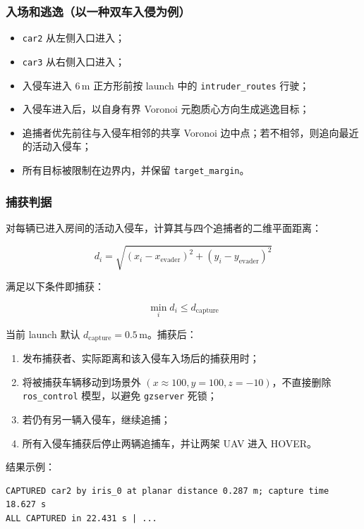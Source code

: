 \subsubsection{入场和逃逸（以一种双车入侵为例）}
\begin{itemize}
\item \texttt{car2} 从左侧入口进入；
\item \texttt{car3} 从右侧入口进入；
\item 入侵车进入 $6\,\mathrm{m}$ 正方形前按 launch 中的 \texttt{intruder\_routes} 行驶；
\item 入侵车进入后，以自身有界 Voronoi 元胞质心方向生成逃逸目标；
\item 追捕者优先前往与入侵车相邻的共享 Voronoi 边中点；若不相邻，则追向最近的活动入侵车；
\item 所有目标被限制在边界内，并保留 \texttt{target\_margin}。
\end{itemize}
\subsubsection{捕获判据}
对每辆已进入房间的活动入侵车，计算其与四个追捕者的二维平面距离：

\begin{equation}
d_i = \sqrt{(x_i-x_{\mathrm{evader}})^2+(y_i-y_{\mathrm{evader}})^2}
\end{equation}

满足以下条件即捕获：

\begin{equation}
\min_i d_i \leq d_{\mathrm{capture}}
\end{equation}

当前 launch 默认 $d_{\mathrm{capture}}=0.5\,\mathrm{m}$。捕获后：
\begin{enumerate}
\item 发布捕获者、实际距离和该入侵车入场后的捕获用时；
\item 将被捕获车辆移动到场景外 $(x\approx100, y=100, z=-10)$，不直接删除
\texttt{ros\_control} 模型，以避免 \texttt{gzserver} 死锁；
\item 若仍有另一辆入侵车，继续追捕；
\item 所有入侵车捕获后停止两辆追捕车，并让两架 UAV 进入 HOVER。
\end{enumerate}


结果示例：

\begin{verbatim}
CAPTURED car2 by iris_0 at planar distance 0.287 m; capture time 18.627 s
ALL CAPTURED in 22.431 s | ...
\end{verbatim}
